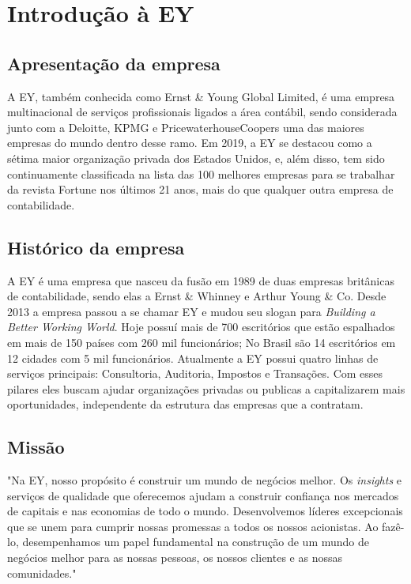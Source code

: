 
\chapter[Introdução]{Introdução à EY}

\section{Apresentação da empresa}
A EY, também conhecida como Ernst & Young Global Limited, é uma empresa multinacional de serviços profissionais ligados a área contábil, sendo considerada junto com a Deloitte, KPMG e PricewaterhouseCoopers uma das maiores empresas do mundo dentro desse ramo. 
Em 2019, a EY se destacou como a sétima maior organização privada dos Estados Unidos, e, além disso, tem sido continuamente classificada na lista das 100 melhores empresas para se trabalhar da revista Fortune nos últimos 21 anos, mais do que qualquer outra empresa de contabilidade.


\section{Histórico da empresa}
A EY é uma empresa que nasceu da fusão em 1989 de duas empresas britânicas de contabilidade, sendo elas a Ernst & Whinney e Arthur Young & Co. Desde 2013 a empresa passou a se chamar EY e mudou seu slogan para \textit{Building a Better Working World}. Hoje possuí mais de 700 escritórios que estão espalhados em mais de 150 países com 260 mil funcionários; No Brasil são 14 escritórios em 12 cidades com 5 mil funcionários. 
Atualmente a EY possui quatro linhas de serviços principais: Consultoria, Auditoria, Impostos e Transações. Com esses pilares eles buscam ajudar organizações privadas ou publicas a capitalizarem mais oportunidades, independente da estrutura das empresas que a contratam.


\section{Missão}
"Na EY, nosso propósito é construir um mundo de negócios melhor. Os \textit{insights} e serviços de qualidade que oferecemos ajudam a construir confiança nos mercados de capitais e nas economias de todo o mundo. Desenvolvemos líderes excepcionais que se unem para cumprir nossas promessas a todos os nossos acionistas. Ao fazê-lo, desempenhamos um papel fundamental na construção de um mundo de negócios melhor para as nossas pessoas, os nossos clientes e as nossas comunidades."

